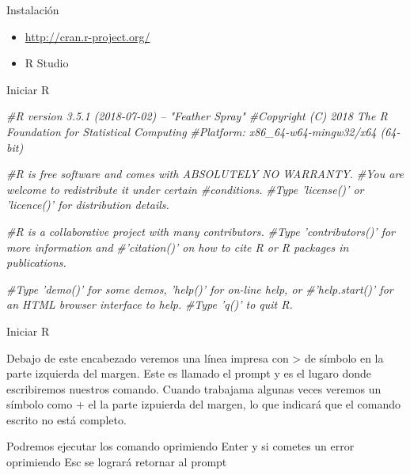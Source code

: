 \documentclass[ignorenonframetext,]{beamer}
\newenvironment{Shaded}{\begin{snugshade}}{\end{snugshade}}
\newcommand{\CommentTok}[1]{\textcolor[rgb]{0.56,0.35,0.01}{\textit{#1}}}
\begin{document}
\begin{frame}{Instalación}

\begin{itemize}
\item
  \url{http://cran.r-project.org/}
\item
  R Studio
\end{itemize}

\end{frame}

\begin{frame}[fragile]{Iniciar R}

\begin{Shaded}
\begin{Highlighting}[]
\CommentTok{#R version 3.5.1 (2018-07-02) -- "Feather Spray"}
\CommentTok{#Copyright (C) 2018 The R Foundation for Statistical   Computing}
\CommentTok{#Platform: x86_64-w64-mingw32/x64 (64-bit)}

\CommentTok{#R is free software and comes with ABSOLUTELY NO WARRANTY.}
\CommentTok{#You are welcome to redistribute it under certain #conditions.}
\CommentTok{#Type 'license()' or 'licence()' for distribution details.}

\CommentTok{#R is a collaborative project with many contributors.}
\CommentTok{#Type 'contributors()' for more information and}
\CommentTok{#'citation()' on how to cite R or R packages in publications.}

\CommentTok{#Type 'demo()' for some demos, 'help()' for on-line help, or}
\CommentTok{#'help.start()' for an HTML browser interface to help.}
\CommentTok{#Type 'q()' to quit R.}
\end{Highlighting}
\end{Shaded}

\end{frame}

\begin{frame}{Iniciar R}

Debajo de este encabezado veremos una línea impresa con \textgreater{}
de símbolo en la parte izquierda del margen. Este es llamado el prompt y
es el lugaro donde escribiremos nuestros comando. Cuando trabajama
algunas veces veremos un símbolo como + el la parte izpuierda del
margen, lo que indicará que el comando escrito no está completo.

Podremos ejecutar los comando oprimiendo Enter y si cometes un error
oprimiendo Esc se logrará retornar al prompt

\end{frame}
\end{document}
